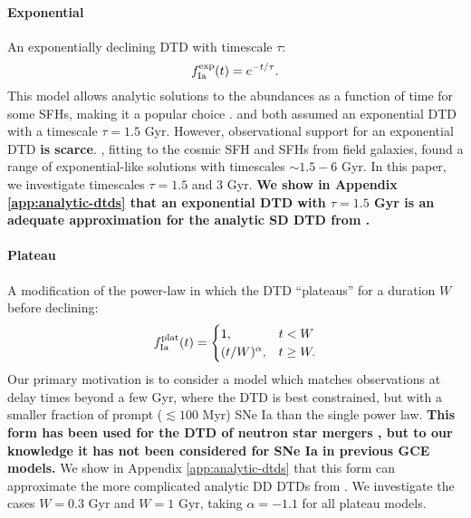 \documentclass[twocolumn,twocolappendix,linenumbers]{aastex631}
\begin{document}
\paragraph{Exponential} An exponentially declining DTD with timescale $\tau$:
\begin{equation}
    f_{\rm Ia}^{\rm exp}(t) = e^{-t/\tau}.
    \label{eq:exponential-dtd}
\end{equation}
This model allows analytic solutions to the abundances as a function of time for some SFHs, making it a popular choice {\bf \citep[e.g.,][]{Weinberg2017-ChemicalEquilibrium,Pantoni2019-AnalyticSolutions,Palicio2023-AnalyticDTD}}. \citet{Schonrich2009-RadialMixing} and \citet{Weinberg2017-ChemicalEquilibrium} both assumed an exponential DTD with a timescale $\tau=1.5$ Gyr. However, observational support for an exponential DTD {\bf is scarce}. \citet{Strolger2020-ExponentialDTD}, fitting to the cosmic SFH and SFHs from field galaxies, found a range of exponential-like solutions with timescales $\sim 1.5 - 6$ Gyr.
In this paper, we investigate timescales $\tau=1.5$ and 3 Gyr. {\bf We show in Appendix \ref{app:analytic-dtds} that an exponential DTD with $\tau=1.5$ Gyr is an adequate approximation for the analytic SD DTD from \citet{Greggio2005-AnalyticalRates}.}

\paragraph{Plateau} A modification of the power-law in which the DTD ``plateaus'' for a duration $W$ before declining:
\begin{equation}
    f_{\rm Ia}^{\rm plat}(t) =
    \begin{cases}
        1, & t < W \\
        (t/W)^\alpha, & t \ge W.
    \end{cases}
    \label{eq:plateau-dtd}
\end{equation}
Our primary motivation is to consider a model which matches observations at delay times beyond a few Gyr, where the DTD is best constrained, but with a smaller fraction of prompt ($\lesssim 100$ Myr) SNe Ia than the single power law. {\bf This form has been used for the DTD of neutron star mergers \citep{Simonetti2019-NeutronStarDTD}, but to our knowledge it has not been considered for SNe Ia in previous GCE models.} We show in Appendix \ref{app:analytic-dtds} that this form can approximate the more complicated analytic DD DTDs from \citet{Greggio2005-AnalyticalRates}. We investigate the cases $W=0.3$ Gyr and $W=1$ Gyr, taking $\alpha=-1.1$ for all plateau models.
\end{document}

